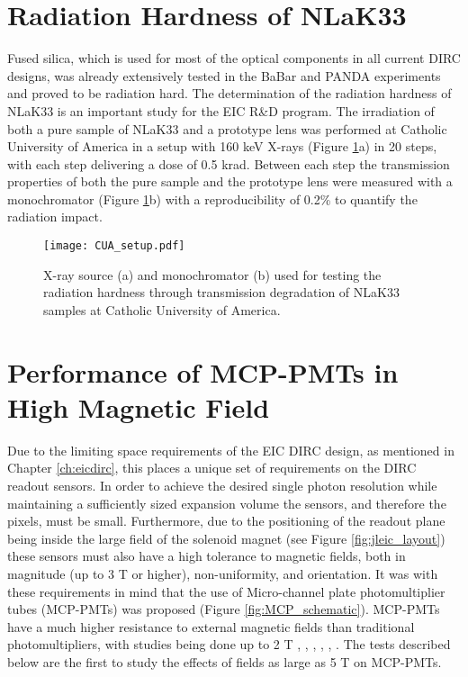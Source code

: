
\section{Radiation Hardness of NLaK33}
Fused silica, which is used for most of the optical components in all current DIRC designs, was already extensively tested in the BaBar and PANDA experiments and proved to be radiation hard. The determination of the radiation hardness of NLaK33 is an important study for the EIC R\&D program. The irradiation of both a pure sample of NLaK33 and a prototype lens was performed at Catholic University of America in a setup with 160 keV X-rays (Figure \ref{fig:CUA_setup}a) in 20 steps, with each step delivering a dose of 0.5 krad. Between each step the transmission properties of both the pure sample and the prototype lens were measured with a monochromator (Figure \ref{fig:CUA_setup}b) with a reproducibility of 0.2\% to quantify the radiation impact.

\begin{figure}[ht]
	\centering
	\texttt{[image: CUA\_setup.pdf]}
	\caption{X-ray source (a) and monochromator (b) used for testing the radiation hardness through transmission degradation of NLaK33 samples at Catholic University of America.}
	\label{fig:CUA_setup}
\end{figure}



\section{Performance of MCP-PMTs in High Magnetic Field}
Due to the limiting space requirements of the EIC DIRC design, as mentioned in Chapter \ref{ch:eicdirc}, this places a unique set of requirements on the DIRC readout sensors. In order to achieve the desired single photon resolution while maintaining a sufficiently sized expansion volume the sensors, and therefore the pixels, must be small. Furthermore, due to the positioning of the readout plane being inside the large field of the solenoid magnet (see Figure \ref{fig:jleic_layout}) these sensors must also have a high tolerance to magnetic fields, both in magnitude (up to 3 T or higher), non-uniformity, and orientation. It was with these requirements in mind that the use of Micro-channel plate photomultiplier tubes (MCP-PMTs) was proposed (Figure \ref{fig:MCP_schematic}). MCP-PMTs have a much higher resistance to external magnetic fields than traditional photomultipliers, with studies being done up to 2 T \cite{MCPTest1}, \cite{MCPTest2}, \cite{MCPTest3}, \cite{MCPTest4}, \cite{MCPTest5}, \cite{MCPTest6}. The tests described below are the first to study the effects of fields as large as 5 T on MCP-PMTs.


